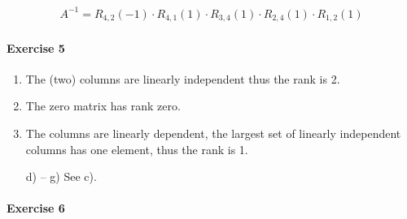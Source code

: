 \documentclass{article}
\begin{document}
\begin{align*}
    A^{-1} = R_{4,2}(-1) \cdot R_{4,1}(1) \cdot R_{3,4}(1) \cdot R_{2,4}(1) \cdot R_{1,2}(1)
\end{align*}

\paragraph{Exercise 5}

\begin{enumerate}
    \item The (two) columns are linearly independent thus the rank is 2.
    \item The zero matrix has rank zero.
    \item The columns are linearly dependent, the largest set of linearly independent columns has one element, thus the rank is 1.
    \item[d) -- g)] See c).
\end{enumerate}

\paragraph{Exercise 6}
\end{document}
